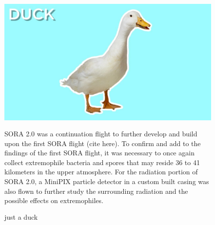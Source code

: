 \begin{figure}[h!]
  \begin{center}
    \begin{minipage}[c]{0.45\linewidth}
      \includegraphics[width=\textwidth]{./figures/duck.jpg}
      \caption{just a duck}
      \label{fig:duck}
    \end{minipage}

SORA 2.0 was a continuation flight to further develop and build upon the first SORA flight (cite here).  To confirm and add to the findings of the first SORA flight, it was necessary to once again collect extremophile bacteria and spores that may reside 36 to 41 kilometers in the upper atmosphere.  For the radiation portion of SORA 2.0, a MiniPIX particle detector in a custom built casing was also flown to further study the surrounding radiation and the possible effects on extremophiles.  




\end{center}
\end{figure}
